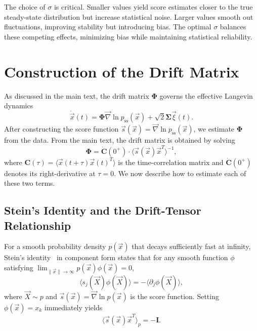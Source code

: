 \documentclass[%
  prl,
  reprint,
  amsmath,
  amssymb,
  aps
]{revtex4-2}
\newcommand{\vvec}[1]{\vec{#1}}
\begin{document}
The choice of $\sigma$ is critical. Smaller values yield score estimates closer to the true steady-state distribution but increase statistical noise. Larger values smooth out fluctuations, improving stability but introducing bias. The optimal $\sigma$ balances these competing effects, minimizing bias while maintaining statistical reliability.

\section{Construction of the Drift Matrix}
\label{appendix:drift_matrix}

As discussed in the main text, the drift matrix $\bm{\Phi}$ governs the effective Langevin dynamics
\begin{equation}
\dot{\vvec{x}}(t) = \bm{\Phi} \vvec{\nabla} \ln p_{\mathrm{ss}}(\vvec{x}) + \sqrt{2}\bm{\Sigma} \vvec{\xi}(t).
\end{equation}
After constructing the score function $\vvec{s}(\vvec{x}) = \vvec{\nabla} \ln p_{\mathrm{ss}}(\vvec{x})$, we estimate $\bm{\Phi}$ from the data. From the main text, the drift matrix is obtained by solving
\begin{equation}
\label{eq:Phi_main}
\bm{\Phi} = \dot{\bm{C}}(0^+) \cdot \langle \vvec{s}(\vvec{x}) \vvec{x}^T \rangle^{-1},
\end{equation}
where $\bm{C}(\tau) = \langle \vvec{x}(t+\tau) \vvec{x}(t)^T \rangle$ is the time-correlation matrix and $\dot{\bm{C}}(0^+)$ denotes its right-derivative at $\tau=0$. We now describe how to estimate each of these two terms.

\subsection{Stein's Identity and the Drift-Tensor Relationship}
\label{appendix:stein_identity}

For a smooth probability density $p(\vvec{x})$ that decays sufficiently fast at infinity, Stein's identity~\cite{stein1981estimation} in component form states that for any smooth function $\phi$ satisfying $\lim_{\|\vvec{x}\|\to\infty} p(\vvec{x})\phi(\vvec{x}) = 0$,
\begin{equation}
\label{eq:stein_component}
\langle s_j(\vvec{X}) \phi(\vvec{X}) \rangle = -\langle \partial_j \phi(\vvec{X}) \rangle,
\end{equation}
where $\vvec{X} \sim p$ and $\vvec{s}(\vvec{x}) = \vvec{\nabla} \ln p(\vvec{x})$ is the score function. Setting $\phi(\vvec{x}) = x_k$ immediately yields
\begin{equation}
\label{eq:stein}
\langle \vvec{s}(\vvec{x}) \vvec{x}^T \rangle_p = -\bm{I}.
\end{equation}
\end{document}
